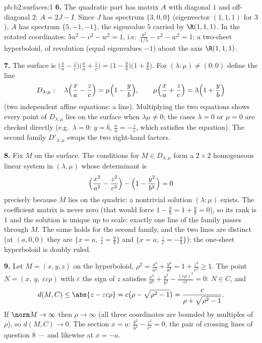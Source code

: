 \begin{solution}{pb:b2:surfaces:1}
\textbf{6.} The quadratic part has matrix $A$ with diagonal
$1$ and off-diagonal $2$: $A = 2J - I$. Since $J$ has spectrum
$\{3, 0, 0\}$ (eigenvector $(1,1,1)$ for $3$), $A$ has
spectrum $\{5, -1, -1\}$, the eigenvalue $5$ carried by
$\R(1,1,1)$. In the rotated coordinates: $5u^2 - v^2 - w^2 =
1$, i.e.\ $\frac{u^2}{1/5} - v^2 - w^2 = 1$: a two-sheet
hyperboloid, of revolution (equal eigenvalues $-1$) about the
axis $\R(1,1,1)$.

\textbf{7.} The surface is $\bigl(\frac xa - \frac
zc\bigr)\bigl(\frac xa + \frac zc\bigr) = \bigl(1 - \frac
yb\bigr)\bigl(1 + \frac yb\bigr)$. For $(\lambda : \mu) \neq
(0:0)$ define the line
\[
D_{\lambda:\mu} :\quad
\lambda\Bigl(\frac xa - \frac zc\Bigr) = \mu\Bigl(1 - \frac
yb\Bigr), \qquad
\mu\Bigl(\frac xa + \frac zc\Bigr) = \lambda\Bigl(1 + \frac
yb\Bigr)
\]
(two independent affine equations: a line). Multiplying the
two equations shows every point of $D_{\lambda:\mu}$ lies on
the surface when $\lambda\mu \neq 0$; the cases $\lambda = 0$
or $\mu = 0$ are checked directly (e.g.\ $\lambda = 0$: $y =
b$, $\frac xa = -\frac zc$, which satisfies the equation). The
second family $D'_{\lambda:\mu}$ swaps the two right-hand
factors.

\textbf{8.} Fix $M$ on the surface. The conditions for $M \in
D_{\lambda:\mu}$ form a $2\times2$ homogeneous linear system
in $(\lambda, \mu)$ whose determinant is
\[
\Bigl(\frac{x^2}{a^2} - \frac{z^2}{c^2}\Bigr) - \Bigl(1 -
\frac{y^2}{b^2}\Bigr) = 0
\]
precisely because $M$ lies on the quadric: a nontrivial
solution $(\lambda : \mu)$ exists. The coefficient matrix is
never zero (that would force $1 - \frac yb = 1 + \frac yb =
0$), so its rank is $1$ and the solution is unique up to
scale: exactly one line of the family passes through $M$.
The same holds for the second family, and the two lines are
distinct (at $(a, 0, 0)$ they are $\{x = a,\ \frac zc = \frac
yb\}$ and $\{x = a,\ \frac zc = -\frac yb\}$): the one-sheet
hyperboloid is doubly ruled.

\textbf{9.} Let $M = (x, y, z)$ on the hyperboloid, $\rho^2 =
\frac{x^2}{a^2} + \frac{y^2}{b^2} = 1 + \frac{z^2}{c^2} \geq
1$. The point $N = (x,\ y,\ \varepsilon c\rho)$ with
$\varepsilon$ the sign of $z$ satisfies $\frac{x^2}{a^2} +
\frac{y^2}{b^2} - \frac{(c\rho)^2}{c^2} = 0$: $N \in C$, and
\[
d(M, C) \leq \abs{z - \varepsilon c\rho}
= c\bigl(\rho - \sqrt{\rho^2 - 1}\bigr)
= \frac{c}{\rho + \sqrt{\rho^2 - 1}} .
\]
If $\norm M \to \infty$ then $\rho \to \infty$ (all three
coordinates are bounded by multiples of $\rho$), so $d(M, C)
\to 0$. The section $x = a$: $\frac{y^2}{b^2} -
\frac{z^2}{c^2} = 0$, the pair of crossing lines of question
8 --- and likewise at $x = -a$.


\end{solution}
